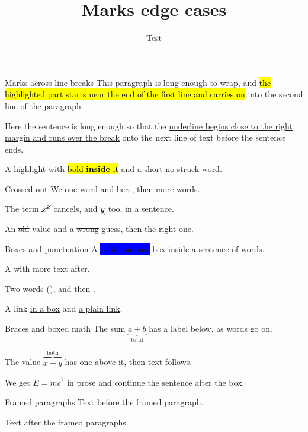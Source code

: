 \documentclass[aspectratio=169]{beamer}
\title{Marks edge cases}
\author{Test}
\date{}
\begin{document}
\begin{frame}{Marks across line breaks}
  This paragraph is long enough to wrap, and \hl{the highlighted part starts near the end of
  the first line and carries on} into the second line of the paragraph.

  Here the sentence is long enough so that the \ul{underline begins close to the right margin
  and runs over the break} onto the next line of text before the sentence ends.

  A highlight with \hl{bold \textbf{inside} it} and a short \sout{no} struck word.
\end{frame}

\begin{frame}{Crossed out}
  We  one word and  here, then more words.

  The term $\cancel{x^2}$ cancels, and $\bcancel{y}$ too, in a sentence.

  An \st{old} value and a \sout{wrong} guess, then the right one.
\end{frame}

\begin{frame}{Boxes and punctuation}
  A \colorbox{blue}{\color{white}white on blue} box inside a sentence of words.

  A {\setlength{\fboxrule}{2pt}} with more text after.

  Two words (), and then .

  A link \colorbox{yellow!40}{\href{https://example.com}{in a box}} and \href{https://example.com}{a plain link}.
\end{frame}

\begin{frame}{Braces and boxed math}
  The sum $\underbrace{a+b}_{\text{total}}$ has a label below, as words go on.

  The value $\overbrace{x+y}^{\text{both}}$ has one above it, then text follows.

  We get $\boxed{E=mc^2}$ in prose and continue the sentence after the box.
\end{frame}

\begin{frame}{Framed paragraphs}
  Text before the framed paragraph.



  Text after the framed paragraphs.
\end{frame}
\end{document}
